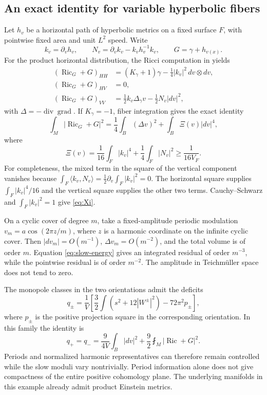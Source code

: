 \documentclass[11pt,a4paper]{article}
\theoremstyle{definition}\newtheorem{definition}[theorem]{Definition}
\theoremstyle{remark}\newtheorem{remark}[theorem]{Remark}
\DeclareMathOperator{\Ric}{Ric}
\newcommand{\avint}{\mathop{\fint}}
\begin{document}
\subsection{An exact identity for variable hyperbolic fibers}
Let $h_v$ be a horizontal path of hyperbolic metrics on a fixed surface $F$, with pointwise fixed area and unit $L^2$ speed. Write
\[
 k_v=\partial_vh_v,\qquad N_v=\partial_vk_v-k_vh_v^{-1}k_v,
 \qquad G=\gamma+h_{v(x)}.
\]
For the product horizontal distribution, the Ricci computation in \cite{source-slow} yields
\begin{align}
 (\Ric_G+G)_{HH}&=(K_\gamma+1)\gamma-
                         \tfrac14|k_v|^2\,dv\otimes dv,\label{eq:slow-Ric}\\
 (\Ric_G+G)_{HV}&=0,\nonumber\\
 (\Ric_G+G)_{VV}&=\tfrac12k_v\Delta_\gamma v-
                              \tfrac12N_v|dv|^2,\nonumber
\end{align}
with $\Delta=-\operatorname{div}\operatorname{grad}$. If $K_\gamma=-1$, fiber integration gives the exact identity
\begin{equation}\label{eq:slow-energy}
 \int_M|\Ric_G+G|^2
   =\frac14\int_B(\Delta v)^2+
                    \int_B\Xi(v)|dv|^4,
\end{equation}
where
\begin{equation}\label{eq:Xi}
 \Xi(v)=\frac1{16}\int_F|k_v|^4+
                  \frac14\int_F|N_v|^2
       \ge\frac1{16V_F}.
\end{equation}
For completeness, the mixed term in the square of the vertical component vanishes because
$\int_F\langle k_v,N_v\rangle=\tfrac12\partial_v\int_F|k_v|^2=0$.
The horizontal square supplies $\int_F|k_v|^4/16$ and the vertical square supplies the other two terms. Cauchy--Schwarz and $\int_F|k_v|^2=1$ give \eqref{eq:Xi}.

On a cyclic cover of degree $m$, take a fixed-amplitude periodic modulation $v_m=a\cos(2\pi z/m)$, where $z$ is a harmonic coordinate on the infinite cyclic cover. Then $|dv_m|=O(m^{-1})$, $\Delta v_m=O(m^{-2})$, and the total volume is of order $m$. Equation \eqref{eq:slow-energy} gives an integrated residual of order $m^{-3}$, while the pointwise residual is of order $m^{-2}$. The amplitude in Teichm\"uller space does not tend to zero.

The monopole classes in the two orientations admit the deficits
\[
 q_\pm=\frac1V\left[\frac32\int(s^2+12|W^\pm|^2)
                                     -72\pi^2p_\pm\right],
\]
where $p_\pm$ is the positive projection square in the corresponding orientation. In this family the identity is
\begin{equation}\label{eq:slow-deficits}
 q_+=q_-=\frac9{4V}\int_B|dv|^2+
                      \frac92\avint_M|\Ric+G|^2.
\end{equation}
Periods and normalized harmonic representatives can therefore remain controlled while the slow moduli vary nontrivially. Period information alone does not give compactness of the entire positive cohomology plane. The underlying manifolds in this example already admit product Einstein metrics.
\end{document}
